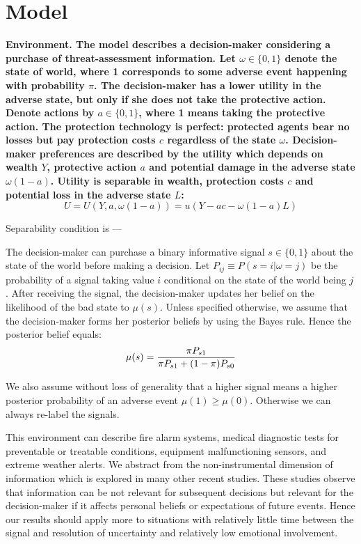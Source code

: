 \documentclass[12pt,a4paper]{article}
\begin{document}
\section{Model}
\vspace{10pt}
\bf Environment. \rm The model describes a decision-maker considering a purchase of threat-assessment information. Let $\omega \in \{0,1\}$ denote the state of world, where 1 corresponds to some adverse event happening with probability $\pi$. The decision-maker has a lower utility in the adverse state, but only if she does not take the protective action. Denote actions by $a\in\{0,1\}$, where 1 means taking the protective action. The protection technology is perfect: protected agents bear no losses but pay protection costs $c$ regardless of the state $\omega$. Decision-maker preferences are described by the utility which depends on wealth $Y$, protective action $a$ and potential damage in the adverse state $\omega(1-a)$. Utility is separable in wealth, protection costs $c$ and potential loss in the adverse state $L$:
\begin{equation}
U=U(Y,a,\omega(1-a))=u(Y-ac-\omega(1-a)L)
\end{equation}

Separability condition is ---

The decision-maker can purchase a binary informative signal $s\in\{0,1\}$ about the state of the world before making a decision. Let $P_{ij}\equiv P(s=i|\omega=j)$ be the probability of a signal taking value $i$ conditional on the state of the world being $j$.  After receiving the signal, the decision-maker updates her belief on the likelihood of the bad state to $\mu(s)$. Unless specified otherwise, we assume that the decision-maker forms her posterior beliefs by using the Bayes rule. Hence the posterior belief equals:
\begin{equation}
\mu(s)= {\pi P_{s1} \over \pi P_{s1}+(1-\pi)P_{s0}}
\end{equation}

We also assume without loss of generality that a higher signal means a higher posterior probability of an adverse event $\mu(1)\geq\mu(0)$. Otherwise we can always re-label the signals.

This environment can describe fire alarm systems, medical diagnostic tests for preventable or treatable conditions, equipment malfunctioning sensors, and extreme weather alerts. We abstract from the non-instrumental dimension of information which is explored in many other recent studies. These studies observe that information can be not relevant for subsequent decisions but relevant for the decision-maker if it affects personal beliefs or expectations of future events.  Hence our results should apply more to situations with relatively little time between the signal and resolution of uncertainty and relatively low emotional involvement.
\end{document}
